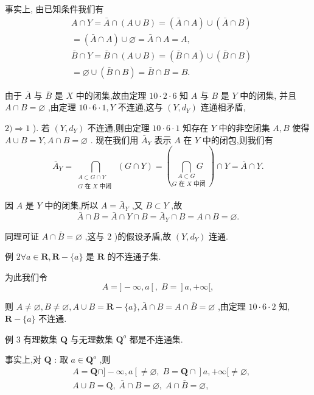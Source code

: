 事实上, 由已知条件我们有
\begin{align*}
	&A \cap  Y = \bar{A} \cap  \left( {A \cup  B}\right)  = \left( {\bar{A} \cap  A}\right)  \cup  \left( {\bar{A} \cap  B}\right)\\
	&= \left( {\bar{A} \cap  A}\right)  \cup  \varnothing  = \bar{A} \cap  A = A,\\
	&\bar{B} \cap  Y = \bar{B} \cap  \left( {A \cup  B}\right)  = \left( {\bar{B} \cap  A}\right)  \cup  \left( {\bar{B} \cap  B}\right)\\
	&= \varnothing  \cup  \left( {\bar{B} \cap  B}\right)  = \bar{B} \cap  B = B.
\end{align*}

由于 $\bar{A}$ 与 $\bar{B}$ 是 $X$ 中的闭集,故由定理 ${10} \cdot  2 \cdot  6$ 知 $A$ 与 $B$ 是 $Y$ 中的闭集, 并且 $A \cap  B = \varnothing$ ,由定理 ${10} \cdot  6 \cdot  1,Y$ 不连通,这与 $\left( {Y,{d}_{Y}}\right)$ 连通相矛盾,

$2) \Rightarrow  1$ ). 若 $\left( {Y,{d}_{Y}}\right)$ 不连通,则由定理 ${10} \cdot  6 \cdot  1$ 知存在 $Y$ 中的非空闭集 $A,B$ 使得 $A \cup  B = Y,A \cap  B = \varnothing$ . 现在我们用 ${\bar{A}}_{Y}$ 表示 $A$ 在 $Y$ 中的闭包,则我们有
$${\bar{A}}_{Y} = \mathop{\bigcap }\limits_{\substack{{A \subset  G \cap  Y} \\  {G\text{ 在 }X\text{ 中闭 }} }}\left( {G \cap  Y}\right)  = \left( \underset{G\text{ 在 }X\text{ 中闭 }}{\mathop{\bigcap }\limits_{{A \subset  G}}G}\right)  \cap  Y = \bar{A} \cap  Y.$$

因 $A$ 是 $Y$ 中的闭集,所以 $A = {\bar{A}}_{Y}$ ,又 $B \subset  Y$ ,故
$$\bar{A} \cap  B = \bar{A} \cap  Y \cap  B = {\bar{A}}_{Y} \cap  B = A \cap  B = \varnothing .$$

同理可证 $A \cap  \bar{B} = \varnothing$ ,这与 2 )的假设矛盾,故 $\left( {Y,{d}_{Y}}\right)$ 连通.

例 $2\forall a \in  \mathbf{R},\mathbf{R} - \{ a\}$ 是 $\mathbf{R}$ 的不连通子集.

为此我们令
$$A = \rbrack  - \infty ,a\left\lbrack  {,\;B = }\right\rbrack  a, + \infty \lbrack ,$$

则 $A \neq  \varnothing ,B \neq  \varnothing ,A \cup  B = \mathbf{R} - \{ a\} ,\bar{A} \cap  B = A \cap  \bar{B} = \varnothing$ ,由定理 ${10} \cdot  6 \cdot  2$ 知, $\mathbf{R} - \{ a\}$ 不连通.

例 3 有理数集 $\mathbf{Q}$ 与无理数集 ${\mathbf{Q}}^{o}$ 都是不连通集.

事实上,对 $\mathbf{Q}$ : 取 $a \in  {\mathbf{Q}}^{o}$ ,则
\begin{align*}
	&A = \mathbf{Q} \cap  \rbrack  - \infty ,a\left\lbrack  { \neq  \varnothing ,\;B = \mathbf{Q} \cap  }\right\rbrack  a, + \infty \lbrack  \neq  \varnothing ,\\
	&A \cup  B = \mathrm{Q},\;\bar{A} \cap  B = \varnothing ,\;A \cap  \bar{B} = \varnothing ,
\end{align*}

